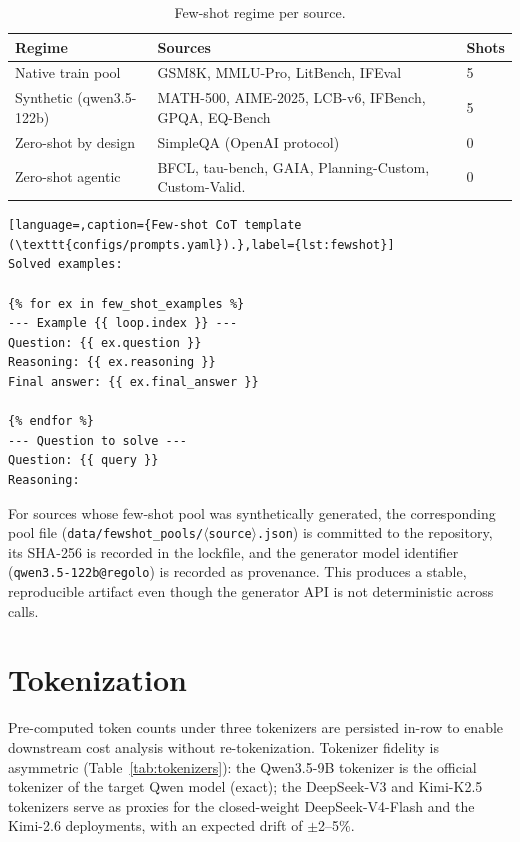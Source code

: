 \documentclass[11pt,a4paper]{article}
\begin{document}
\begin{table}[ht]
\centering
\caption{Few-shot regime per source.}
\label{tab:fewshot}
\small
\begin{tabular}{l l l}
\toprule
\textbf{Regime} & \textbf{Sources} & \textbf{Shots} \\
\midrule
Native train pool       & GSM8K, MMLU-Pro, LitBench, IFEval                     & 5 \\
Synthetic (qwen3.5-122b)& MATH-500, AIME-2025, LCB-v6, IFBench, GPQA, EQ-Bench  & 5 \\
Zero-shot by design     & SimpleQA (OpenAI protocol)                            & 0 \\
Zero-shot agentic       & BFCL, tau-bench, GAIA, Planning-Custom, Custom-Valid. & 0 \\
\bottomrule
\end{tabular}
\end{table}

\begin{lstlisting}[language=,caption={Few-shot CoT template (\texttt{configs/prompts.yaml}).},label={lst:fewshot}]
Solved examples:

{% for ex in few_shot_examples %}
--- Example {{ loop.index }} ---
Question: {{ ex.question }}
Reasoning: {{ ex.reasoning }}
Final answer: {{ ex.final_answer }}

{% endfor %}
--- Question to solve ---
Question: {{ query }}
Reasoning:
\end{lstlisting}

For sources whose few-shot pool was synthetically generated, the corresponding pool file (\texttt{data/fewshot\_pools/$\langle$source$\rangle$.json}) is committed to the repository, its SHA-256 is recorded in the lockfile, and the generator model identifier (\texttt{qwen3.5-122b@regolo}) is recorded as provenance. This produces a stable, reproducible artifact even though the generator API is not deterministic across calls.

\section{Tokenization}\label{sec:tokenization}

Pre-computed token counts under three tokenizers are persisted in-row to enable downstream cost analysis without re-tokenization. Tokenizer fidelity is asymmetric (Table~\ref{tab:tokenizers}): the Qwen3.5-9B tokenizer is the official tokenizer of the target Qwen model (exact); the DeepSeek-V3 and Kimi-K2.5 tokenizers serve as proxies for the closed-weight DeepSeek-V4-Flash and the Kimi-2.6 deployments, with an expected drift of $\pm$2--5\%.
\end{document}
